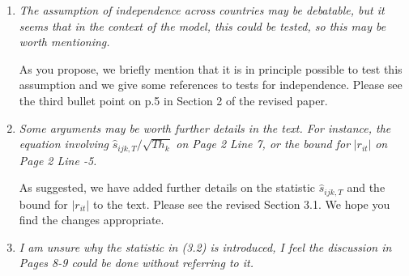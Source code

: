 \documentclass[a4paper,12pt]{article}
\begin{document}
\begin{enumerate}[label=(\arabic*),leftmargin=0.7cm]


\item \textit{The assumption of independence across countries may be debatable, but it seems that in the context of the model, this could be tested, so this may be worth mentioning.}

As you propose, we briefly mention that it is in principle possible to test this assumption and we give some references to tests for independence. Please see the third bullet point on p.5 in Section 2 of the revised paper.

%
%


\item \textit{Some arguments may be worth further details in the text. For instance, the equation involving} $\hat{s}_{ijk,T} / \sqrt{T h_k}$ \textit{on Page 2 Line 7, or the bound for} $|r_{it}|$ \textit{on Page 2 Line -5.}

As suggested, we have added further details on the statistic $\hat{s}_{ijk,T}$ and the bound for $|r_{it}|$ to the text. Please see the revised Section 3.1. We hope you find the changes appropriate.  


\item \textit{I am unsure why the statistic in (3.2) is introduced, I feel the discussion in Pages 8-9 could be done without referring to it.}


\end{enumerate}
\end{document}
